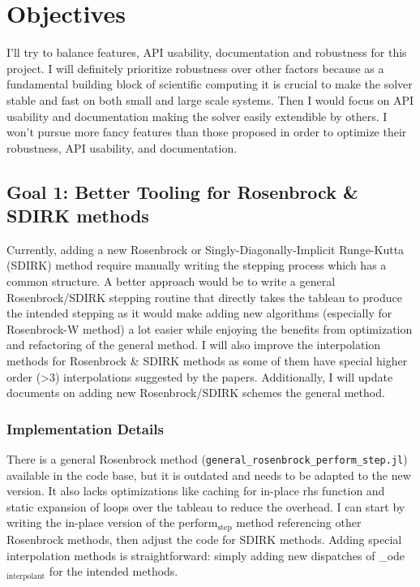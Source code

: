\documentclass[a4paper]{article}
\begin{document}
\section{Objectives}
\label{sec:orgeb80cbb}
I'll try to balance features, API usability, documentation and robustness for
this project. I will definitely prioritize robustness over other factors because
as a fundamental building block of scientific computing it is crucial to make
the solver stable and fast on both small and large scale systems. Then I would
focus on API usability and documentation making the solver easily extendible by
others. I won't pursue more fancy features than those proposed in order to
optimize their robustness, API usability, and documentation. 

\subsection{Goal 1: Better Tooling for Rosenbrock \& SDIRK methods}
\label{sec:orgbc3d7d9}
Currently, adding a new Rosenbrock or Singly-Diagonally-Implicit Runge-Kutta
(SDIRK) method require manually writing the stepping process which has a common
structure. A better approach would be to write a general Rosenbrock/SDIRK
stepping routine that directly takes the tableau to produce the intended
stepping as it would make adding new algorithms (especially for Rosenbrock-W
method) a lot easier while enjoying the benefits from optimization and
refactoring of the general method. I will also improve the interpolation methods
for Rosenbrock \& SDIRK methods as some of them have special higher order (>3)
interpolations suggested by the papers. Additionally, I will update documents on
adding new Rosenbrock/SDIRK schemes the general method. 

\subsubsection{Implementation Details}
\label{sec:org0ac3a00}
There is a general Rosenbrock method (\texttt{general\_rosenbrock\_perform\_step.jl})
available in the code base, but it is outdated and needs to be adapted to the
new version. It also lacks optimizations like caching for in-place rhs function
and static expansion of loops over the tableau to reduce the overhead. I can
start by writing the in-place version of the perform\(_{\text{step}}\) method referencing
other Rosenbrock methods, then adjust the code for SDIRK methods. Adding special
interpolation methods is straightforward: simply adding new dispatches of
\_ode\(_{\text{interpolant}}\) for the intended methods. 
\end{document}
